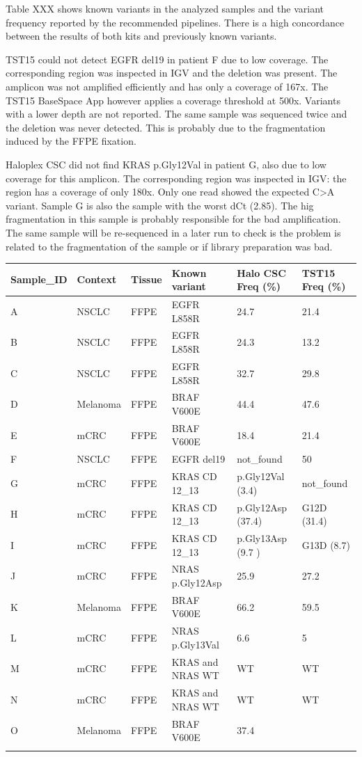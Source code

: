Table XXX shows known variants in the analyzed samples and the variant frequency
reported by the recommended pipelines. There is a high concordance between  the
results of both kits and previously known variants.

TST15 could not detect EGFR del19 in patient F due to low coverage. The
corresponding region was inspected in IGV and the deletion was present.  The
amplicon was not amplified  efficiently and has only a coverage of 167x. The
TST15 BaseSpace App however  applies a coverage threshold at 500x. Variants with
a lower depth are not reported. The same sample was sequenced twice and the
deletion was never detected. This is probably due to the fragmentation induced
by the FFPE fixation.

Haloplex CSC did not find KRAS p.Gly12Val in patient G, also due to low coverage
for this amplicon. The corresponding region was inspected in IGV: the region has
a coverage of only 180x. Only one read showed the expected C>A variant.  Sample
G is also the sample with the worst dCt (2.85). The  hig fragmentation in this
sample is probably responsible for the bad amplification. The same sample will
be re-sequenced in a later run to check  is the problem is related to the
fragmentation of the sample or if library preparation was bad.

\begin{table}
\begin{tabular}{p{3.5cm} p{1cm} p{1cm}}\\
\hline
Sample_ID & Context & Tissue & Known variant & Halo CSC Freq (\%) & TST15 Freq (\%) \\
\hline
A & NSCLC & FFPE & EGFR L858R & 24.7 & 21.4 \\
B & NSCLC & FFPE & EGFR L858R & 24.3 & 13.2 \\
C & NSCLC & FFPE & EGFR L858R & 32.7 & 29.8\\
D & Melanoma & FFPE & BRAF V600E & 44.4 & 47.6 \\
E & mCRC & FFPE & BRAF V600E & 18.4 & 21.4 \\
F & NSCLC & FFPE & EGFR del19 & not_found & 50 \\
G & mCRC & FFPE & KRAS CD 12_13 & p.Gly12Val (3.4) & not_found \\
H & mCRC & FFPE & KRAS CD 12_13  & p.Gly12Asp (37.4) & G12D (31.4)\\
I & mCRC & FFPE & KRAS CD 12_13  & p.Gly13Asp (9.7 )& G13D (8.7) \\
J & mCRC & FFPE & NRAS p.Gly12Asp & 25.9 & 27.2 \\
K & Melanoma & FFPE & BRAF V600E & 66.2 & 59.5 \\
L & mCRC & FFPE & NRAS p.Gly13Val & 6.6 & 5 \\
M & mCRC & FFPE & KRAS and NRAS WT & WT & WT \\
N & mCRC & FFPE & KRAS and NRAS WT & WT & WT \\
O & Melanoma & FFPE &BRAF V600E & 37.4 & \\
\label{known_variants}
\end{tabular}
\end{table}

